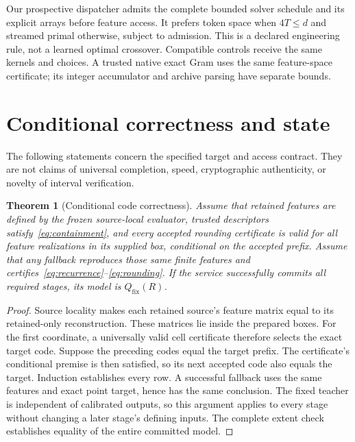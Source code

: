 \documentclass[10pt,twocolumn,letterpaper]{article}
\newtheorem{theorem}{Theorem}
\newcommand{\Qfix}{Q_{\mathrm{fix}}}
\begin{document}
Our prospective dispatcher admits the complete bounded solver schedule and its
explicit arrays before feature access. It prefers token space when $4T\leq d$
and streamed primal otherwise, subject to admission. This is a declared
engineering rule, not a learned optimal crossover. Compatible controls receive
the same kernels and choices. A trusted native exact Gram uses the same
feature-space certificate; its integer accumulator and archive parsing have
separate bounds.

\section{Conditional correctness and state}
The following statements concern the specified target and access contract. They
are not claims of universal completion, speed, cryptographic authenticity, or
novelty of interval verification.

\begin{theorem}[Conditional code correctness]
\label{thm:codes}
Assume that retained features are defined by the frozen source-local evaluator,
trusted descriptors satisfy~\eqref{eq:containment}, and every accepted rounding
certificate is valid for all feature realizations in its supplied box, conditional
on the accepted prefix. Assume that any fallback reproduces those same finite
features and certifies~\eqref{eq:recurrence}--\eqref{eq:rounding}. If the service
successfully commits all required stages, its model is $\Qfix(R)$.
\end{theorem}
\begin{proof}
Source locality makes each retained source's feature matrix equal to its
retained-only reconstruction. These matrices lie inside the prepared boxes.
For the first coordinate, a universally valid cell certificate therefore selects
the exact target code. Suppose the preceding codes equal the target prefix. The
certificate's conditional premise is then satisfied, so its next accepted code
also equals the target. Induction establishes every row. A successful fallback
uses the same features and exact point target, hence has the same conclusion.
The fixed teacher is independent of calibrated outputs, so this argument applies
to every stage without changing a later stage's defining inputs. The complete
extent check establishes equality of the entire committed model.
\end{proof}
\end{document}
